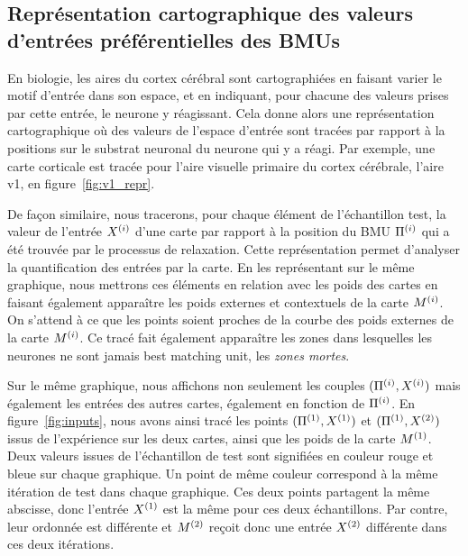 \subsection{Représentation cartographique des valeurs d'entrées préférentielles des BMUs}

En biologie, les aires du cortex cérébral sont cartographiées en faisant varier le motif d'entrée dans son espace, et en indiquant, pour chacune des valeurs prises par cette entrée, le neurone y réagissant. Cela donne alors une représentation cartographique où des valeurs de l'espace d'entrée sont tracées par rapport à la positions sur le substrat neuronal du neurone qui y  a réagi.
Par exemple, une carte corticale est tracée pour l'aire visuelle primaire du cortex cérébrale, l'aire v1, en figure~\ref{fig:v1_repr}.

De façon similaire, nous tracerons, pour chaque élément de l'échantillon test, la valeur de l'entrée $X^{({i})}$ d'une carte par rapport à la position du BMU $\Pi^{({i})}$ qui a été trouvée par le processus de relaxation.
Cette représentation permet d'analyser la quantification des entrées par la carte. En les représentant sur le même graphique, nous mettrons ces éléments en relation avec les poids des cartes en faisant également apparaître les poids externes et contextuels de la carte $M^{({i})}$.
On s'attend à ce que les points soient proches de la courbe des poids externes de la carte $M^{({i})}$.
Ce tracé fait également apparaître les zones dans lesquelles les neurones ne sont jamais best matching unit, les \emph{zones mortes}.

Sur le même graphique, nous affichons non seulement les couples $(\Pi^{({i})},X^{({i})})$ mais également les entrées des autres cartes, également en fonction de $\Pi^{({i})}$.
En figure~\ref{fig:inputs}, nous avons ainsi tracé les points $(\Pi^{({1})},X^{({1})})$ et $(\Pi^{({1})},X^{({2})})$ issus de l'expérience sur les deux cartes, ainsi que les poids de la carte $M^{({1})}$.
Deux valeurs issues de l'échantillon de test sont signifiées en couleur rouge et bleue sur chaque graphique. Un point de même couleur correspond à la même itération de test dans chaque graphique. Ces deux points partagent la même abscisse, donc l'entrée $X^{({1})}$ est la même pour ces deux échantillons. Par contre, leur ordonnée est différente et $M^{({2})}$ reçoit donc une entrée $X^{({2})}$ différente dans ces deux itérations.

